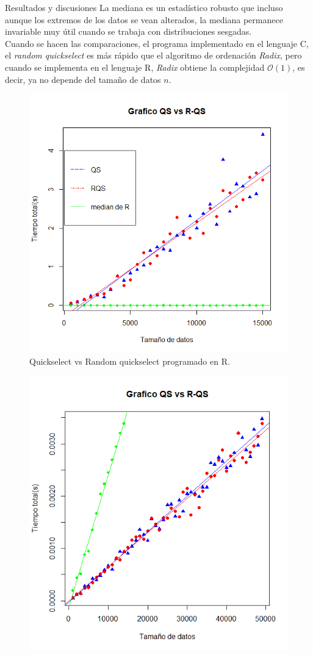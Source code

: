 \documentclass[final]{beamer}
\newlength{\onecolwid}
\begin{document}
\begin{frame}[t]
\begin{columns}[t]
\begin{column}{\onecolwid}
			\begin{block}{Resultados y discusiones}
				La mediana es un estadístico robusto que incluso aunque los extremos de los datos se vean alterados, la mediana permanece invariable muy útil cuando se trabaja con distribuciones sesgadas.\\[0.5\baselineskip]
				Cuando se hacen las comparaciones, el programa implementado en el lenguaje C, el \emph{random quickselect} es más rápido que el algoritmo de ordenación \emph{Radix}, pero cuando se implementa en el lenguaje R, \emph{Radix} obtiene la complejidad $\mathcal{O}(1)$, es decir, ya no depende del tamaño de datos $n$.
			\end{block}
			\vspace{-0.8cm}

			\begin{figure}
				\centering
				\includegraphics[width=.73\linewidth]{Rplot.png}
				\caption{Quickselect vs Random quickselect programado en R.}
			\end{figure}
			\vspace{-1.5cm}
			\begin{figure}
				\centering
				\includegraphics[width=.73\linewidth]{Cplot.png}

\end{figure}
\end{column}
\end{columns}
\end{frame}
\end{document}
